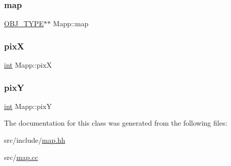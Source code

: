 \mbox{\label{class_mapp_a91181e95875bc82d03e832b9d901cb59}} 
\subsubsection{\texorpdfstring{map}{map}}
{\footnotesize\ttfamily \mbox{\hyperlink{map_8hh_a714b9c2c276fbae637fee36453d9121e}{O\+B\+J\+\_\+\+T\+Y\+PE}}$\ast$$\ast$ Mapp\+::map\hspace{0.3cm}{\ttfamily [protected]}}

\mbox{\label{class_mapp_a0d751ee7f6aacc352c1ffb1bf95c21af}} 
\subsubsection{\texorpdfstring{pixX}{pixX}}
{\footnotesize\ttfamily \mbox{\hyperlink{draw_8hh_aa620a13339ac3a1177c86edc549fda9b}{int}} Mapp\+::pixX\hspace{0.3cm}{\ttfamily [protected]}}

\mbox{\label{class_mapp_a756d60b3d694342b7c75621c8559c00e}} 
\subsubsection{\texorpdfstring{pixY}{pixY}}
{\footnotesize\ttfamily \mbox{\hyperlink{draw_8hh_aa620a13339ac3a1177c86edc549fda9b}{int}} Mapp\+::pixY\hspace{0.3cm}{\ttfamily [protected]}}



The documentation for this class was generated from the following files\+:\begin{DoxyCompactItemize}
\item 
src/include/\mbox{\hyperlink{map_8hh}{map.\+hh}}\item 
src/\mbox{\hyperlink{map_8cc}{map.\+cc}}\end{DoxyCompactItemize}
